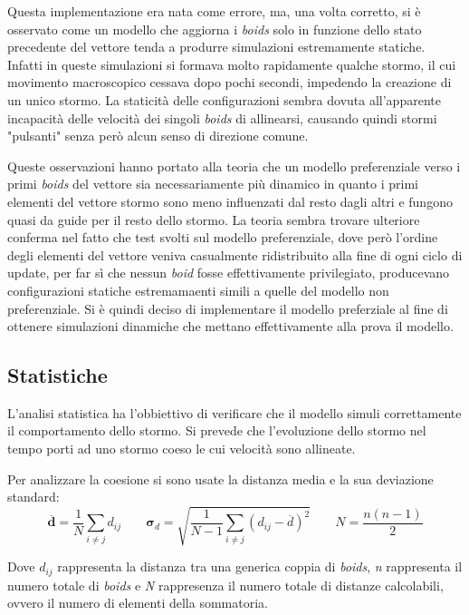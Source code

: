 \documentclass{article}
\begin{document}
Questa implementazione era nata come errore, ma, una volta corretto, si è osservato come un modello che aggiorna i \textit{boids} solo in funzione dello stato precedente del vettore tenda a produrre simulazioni estremamente statiche. Infatti in queste simulazioni si formava molto rapidamente qualche stormo, il cui movimento macroscopico cessava dopo pochi secondi, impedendo la creazione di un unico stormo. La staticità delle configurazioni sembra dovuta all'apparente incapacità delle velocità dei singoli \textit{boids} di allinearsi, causando quindi stormi "pulsanti" senza però alcun senso di direzione comune. 

Queste osservazioni hanno portato alla teoria che un modello preferenziale verso i primi \textit{boids} del vettore sia necessariamente più dinamico in quanto i primi elementi del vettore stormo sono meno influenzati dal resto dagli altri e fungono quasi da guide per il resto dello stormo. La teoria sembra trovare ulteriore conferma nel fatto che test svolti sul modello preferenziale, dove però l'ordine degli elementi del vettore veniva casualmente ridistribuito alla fine di ogni ciclo di update, per far sì che nessun \textit{boid} fosse effettivamente privilegiato, producevano configurazioni statiche  estremamaenti simili a quelle del modello non preferenziale. 
Si è quindi deciso di implementare il modello preferziale al fine di ottenere simulazioni dinamiche che mettano effettivamente alla prova il modello.


\subsection{Statistiche}

L'analisi statistica ha l'obbiettivo di verificare che il modello simuli correttamente il comportamento dello stormo. Si prevede che l'evoluzione dello stormo nel tempo porti ad uno stormo coeso le cui velocità sono allineate. 

Per analizzare la coesione si sono usate la distanza media e la sua deviazione standard: 
\bigskip
\[
\mathbf{\overline{d}} = \frac{1}{N}\sum_{ i \neq j}^{} d_{ij} \;\;\;\;\;\;\;
\mathbf{\sigma}_d = \sqrt{\frac{1}{N-1}\sum_{i \neq j} (d_{ij} - \overline{d})^2}
\;\;\;\;\;\;\;N=\frac{n(n-1)}{2}
\] \medskip

Dove $d_{ij}$ rappresenta la distanza tra una generica coppia di \textit{boids}, \textit{n} rappresenta il numero totale di \textit{boids} e \textit{N} rappresenza il numero totale di distanze calcolabili, ovvero il numero di elementi della sommatoria.
\end{document}
